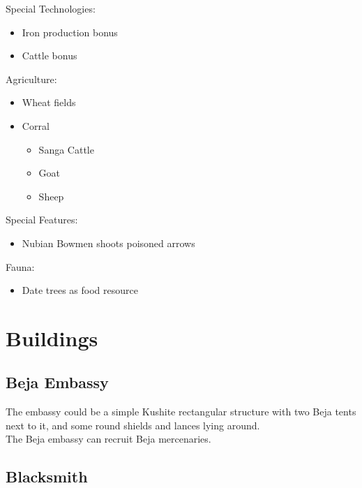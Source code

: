 \documentclass[a4paper,12pt]{scrreprt}
\begin{document}
Special Technologies:

\begin{itemize}
	\item Iron production bonus
	\item Cattle bonus
\end{itemize}

Agriculture:

\begin{itemize}
	\item Wheat fields
	\item Corral
	\begin{itemize}
		\item Sanga Cattle
		\item Goat
		\item Sheep
	\end{itemize}
\end{itemize}
Special Features:

\begin{itemize}
	\item Nubian Bowmen shoots poisoned arrows
\end{itemize}

Fauna:

\begin{itemize}
	\item Date trees as food resource
\end{itemize}

\section{Buildings}

\subsection{Beja Embassy}

The embassy could be a simple Kushite rectangular structure with two Beja tents next to it, and some round shields and lances lying around.\\

The Beja embassy can recruit Beja mercenaries.

\subsection{Blacksmith}
\end{document}
